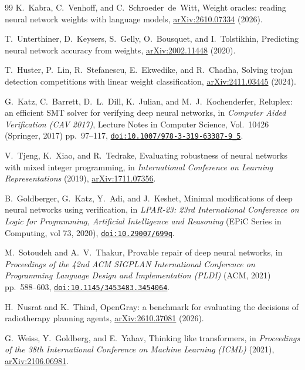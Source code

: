 \documentclass[aps,prx,reprint,superscriptaddress,nofootinbib]{revtex4-2}
\begin{document}
\begin{thebibliography}{99}
K.~Kabra, C.~Venhoff, and C.~Schroeder~de~Witt, Weight oracles: reading neural network weights with
language models, \href{https://arxiv.org/abs/2610.07334}{arXiv:2610.07334} (2026).

T.~Unterthiner, D.~Keysers, S.~Gelly, O.~Bousquet, and I.~Tolstikhin, Predicting neural network
accuracy from weights, \href{https://arxiv.org/abs/2002.11448}{arXiv:2002.11448} (2020).

T.~Huster, P.~Lin, R.~Stefanescu, E.~Ekwedike, and R.~Chadha, Solving trojan detection competitions
with linear weight classification, \href{https://arxiv.org/abs/2411.03445}{arXiv:2411.03445} (2024).

G.~Katz, C.~Barrett, D.~L.~Dill, K.~Julian, and M.~J.~Kochenderfer, Reluplex: an efficient SMT
solver for verifying deep neural networks, in \textit{Computer Aided Verification (CAV 2017)},
Lecture Notes in Computer Science, Vol.~10426 (Springer, 2017) pp.~\mbox{97--117},
\href{https://doi.org/10.1007/978-3-319-63387-9_5}{\nolinkurl{doi:10.1007/978-3-319-63387-9_5}}.

V.~Tjeng, K.~Xiao, and R.~Tedrake, Evaluating robustness of neural networks with mixed integer
programming, in \textit{International Conference on Learning Representations} (2019),
\href{https://arxiv.org/abs/1711.07356}{arXiv:1711.07356}.

B.~Goldberger, G.~Katz, Y.~Adi, and J.~Keshet, Minimal modifications of deep neural networks using
verification, in \textit{LPAR-23: 23rd International Conference on Logic for Programming, Artificial
Intelligence and Reasoning} (EPiC Series in Computing, vol 73, 2020),
\href{https://doi.org/10.29007/699q}{\nolinkurl{doi:10.29007/699q}}.

M.~Sotoudeh and A.~V.~Thakur, Provable repair of deep neural networks, in \textit{Proceedings of the
42nd ACM SIGPLAN International Conference on Programming Language Design and Implementation (PLDI)}
(ACM, 2021) pp.~\mbox{588--603},
\href{https://doi.org/10.1145/3453483.3454064}{\nolinkurl{doi:10.1145/3453483.3454064}}.

H.~Nusrat and K.~Thind, OpenGray: a benchmark for evaluating the decisions of radiotherapy planning
agents, \href{https://arxiv.org/abs/2610.37081}{arXiv:2610.37081} (2026).

G.~Weiss, Y.~Goldberg, and E.~Yahav, Thinking like transformers, in \textit{Proceedings of the 38th
International Conference on Machine Learning (ICML)} (2021),
\href{https://arxiv.org/abs/2106.06981}{arXiv:2106.06981}.


\end{thebibliography}
\end{document}
